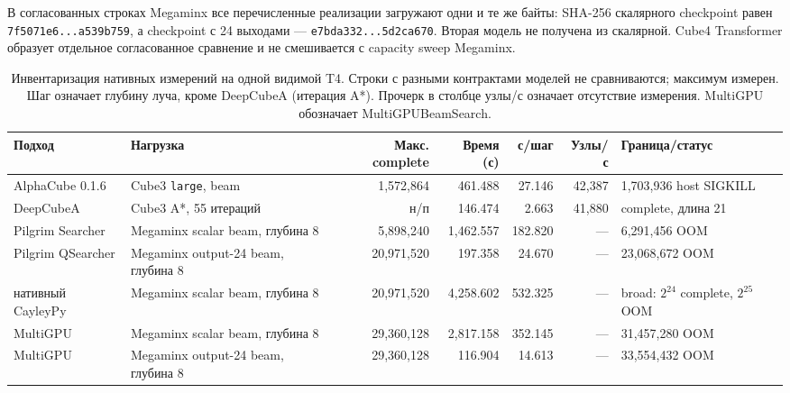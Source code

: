\documentclass[10pt,twocolumn]{article}
\begin{document}
В согласованных строках Megaminx все перечисленные реализации загружают одни
и те же байты: SHA-256 скалярного checkpoint равен
\texttt{7f5071e6...a539b759}, а checkpoint с 24 выходами ---
\texttt{e7bda332...5d2ca670}. Вторая модель не получена из скалярной. Cube4
Transformer образует отдельное согласованное сравнение и не смешивается с
capacity sweep Megaminx.

\begin{table}[t]
\centering
\small
\setlength{\tabcolsep}{3pt}
\caption{Инвентаризация нативных измерений на одной видимой T4. Строки с
разными контрактами моделей не сравниваются; максимум измерен.
Шаг означает глубину луча, кроме DeepCubeA (итерация A*).
Прочерк в столбце узлы/с означает отсутствие измерения.
MultiGPU обозначает MultiGPUBeamSearch.}
\label{tab:four_t4}
\renewcommand{\arraystretch}{1.12}
\begin{tabularx}{\textwidth}{@{}L{2.45cm}L{2.45cm}rrrrY@{}}
\toprule
Подход & Нагрузка & Макс. complete & Время (с) & с/шаг & Узлы/с & Граница/статус \\
\midrule
AlphaCube 0.1.6 & Cube3 \texttt{large}, beam & 1,572,864 & 461.488 & 27.146 & 42,387 & 1,703,936 host SIGKILL \\
DeepCubeA & Cube3 A*, 55 итераций & н/п & 146.474 & 2.663 & 41,880 & complete, длина 21 \\
Pilgrim Searcher & Megaminx scalar beam, глубина 8 & 5,898,240 & 1,462.557 & 182.820 & --- & 6,291,456 OOM \\
Pilgrim QSearcher & Megaminx output-24 beam, глубина 8 & 20,971,520 & 197.358 & 24.670 & --- & 23,068,672 OOM \\
нативный CayleyPy & Megaminx scalar beam, глубина 8 & 20,971,520 & 4,258.602 & 532.325 & --- & broad: $2^{24}$ complete, $2^{25}$ OOM \\
MultiGPU & Megaminx scalar beam, глубина 8 & 29,360,128 & 2,817.158 & 352.145 & --- & 31,457,280 OOM \\
MultiGPU & Megaminx output-24 beam, глубина 8 & 29,360,128 & 116.904 & 14.613 & --- & 33,554,432 OOM \\
\bottomrule
\end{tabularx}
\end{table}
\end{document}
